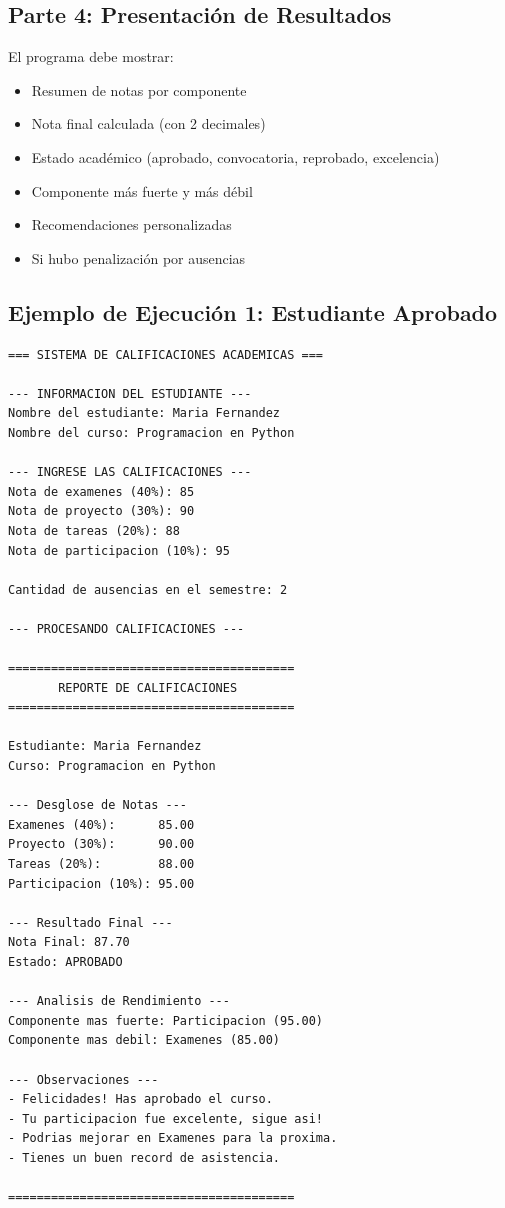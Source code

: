 \documentclass[12pt,a4paper]{article}
\begin{document}
\subsection{Parte 4: Presentación de Resultados}

El programa debe mostrar:

\begin{itemize}[leftmargin=*]
    \item Resumen de notas por componente
    \item Nota final calculada (con 2 decimales)
    \item Estado académico (aprobado, convocatoria, reprobado, excelencia)
    \item Componente más fuerte y más débil
    \item Recomendaciones personalizadas
    \item Si hubo penalización por ausencias
\end{itemize}

\newpage

\subsection{Ejemplo de Ejecución 1: Estudiante Aprobado}

\begin{lstlisting}[caption=Ejemplo - Estudiante aprobado con buenas notas]
=== SISTEMA DE CALIFICACIONES ACADEMICAS ===

--- INFORMACION DEL ESTUDIANTE ---
Nombre del estudiante: Maria Fernandez
Nombre del curso: Programacion en Python

--- INGRESE LAS CALIFICACIONES ---
Nota de examenes (40%): 85
Nota de proyecto (30%): 90
Nota de tareas (20%): 88
Nota de participacion (10%): 95

Cantidad de ausencias en el semestre: 2

--- PROCESANDO CALIFICACIONES ---

========================================
       REPORTE DE CALIFICACIONES
========================================

Estudiante: Maria Fernandez
Curso: Programacion en Python

--- Desglose de Notas ---
Examenes (40%):      85.00
Proyecto (30%):      90.00
Tareas (20%):        88.00
Participacion (10%): 95.00

--- Resultado Final ---
Nota Final: 87.70
Estado: APROBADO

--- Analisis de Rendimiento ---
Componente mas fuerte: Participacion (95.00)
Componente mas debil: Examenes (85.00)

--- Observaciones ---
- Felicidades! Has aprobado el curso.
- Tu participacion fue excelente, sigue asi!
- Podrias mejorar en Examenes para la proxima.
- Tienes un buen record de asistencia.

========================================
\end{lstlisting}
\end{document}
